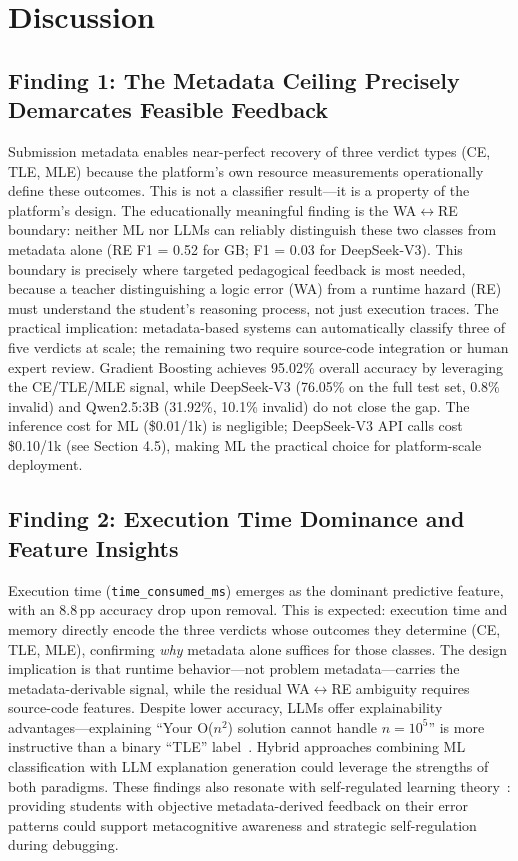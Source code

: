 \documentclass[acmsmall]{acmart}
\begin{document}
\section{Discussion}

\subsection{Finding 1: The Metadata Ceiling Precisely Demarcates Feasible Feedback}

Submission metadata enables near-perfect recovery of three verdict types
(CE, TLE, MLE) because the platform's own resource measurements operationally
define these outcomes. This is not a classifier result---it is a property of the
platform's design. The educationally meaningful finding is the
WA$\leftrightarrow$RE boundary: neither ML nor LLMs can reliably distinguish
these two classes from metadata alone (RE F1 = 0.52 for GB; F1 = 0.03 for
DeepSeek-V3). This boundary is precisely where targeted pedagogical feedback
is most needed, because a teacher distinguishing a logic error (WA) from a
runtime hazard (RE) must understand the student's reasoning process, not just
execution traces. The practical implication: metadata-based systems can
automatically classify three of five verdicts at scale; the remaining two
require source-code integration or human expert review. Gradient Boosting
achieves 95.02\% overall accuracy by leveraging the CE/TLE/MLE signal, while
DeepSeek-V3 (76.05\% on the full test set, 0.8\% invalid) and Qwen2.5:3B
(31.92\%, 10.1\% invalid) do not close the gap. The inference cost for ML
(\$0.01/1k) is negligible; DeepSeek-V3 API calls cost \$0.10/1k (see Section 4.5),
making ML the practical choice for platform-scale deployment.

\subsection{Finding 2: Execution Time Dominance and Feature Insights}

Execution time (\texttt{time\_consumed\_ms}) emerges as the dominant
predictive feature, with an 8.8\,pp accuracy drop upon removal. This is
expected: execution time and memory directly encode the three
verdicts whose outcomes they determine (CE, TLE, MLE), confirming \emph{why}
metadata alone suffices for those classes. The design implication is that
runtime behavior---not problem metadata---carries the metadata-derivable
signal, while the residual WA$\leftrightarrow$RE ambiguity requires
source-code features. Despite lower accuracy, LLMs offer explainability
advantages---explaining ``Your O($n^2$) solution cannot handle $n = 10^5$'' is
more instructive than a binary ``TLE'' label~\cite{finnie2022robots}. Hybrid
approaches combining ML classification with LLM explanation generation could
leverage the strengths of both paradigms. These findings also resonate with self-regulated learning theory~\cite{panadero2017review}: providing students with objective metadata-derived feedback on their error patterns could support metacognitive awareness and strategic self-regulation during debugging.
\end{document}

